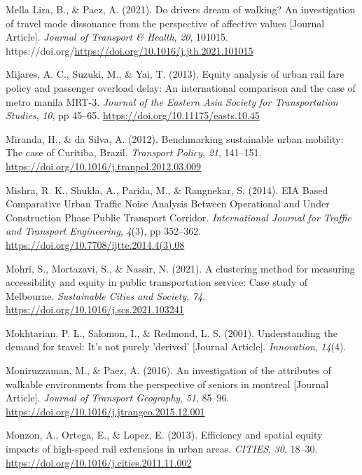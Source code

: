 \documentclass[
  letterpaper,
  DIV=11,
  numbers=noendperiod]{scrartcl}
\newlength{\cslhangindent}
\newenvironment{CSLReferences}[2] %
 {\begin{list}{}{%
  \setlength{\itemindent}{0pt}
  \setlength{\leftmargin}{0pt}
  \setlength{\parsep}{0pt}
  \ifodd #1
   \setlength{\leftmargin}{\cslhangindent}
   \setlength{\itemindent}{-1\cslhangindent}
  \fi
  \setlength{\itemsep}{#2\baselineskip}}}
 {\end{list}}
\begin{document}
\begin{CSLReferences}{1}{0}
Mella Lira, B., \& Paez, A. (2021). Do drivers dream of walking? An
investigation of travel mode dissonance from the perspective of
affective values {[}Journal Article{]}. \emph{Journal of Transport \&
Health}, \emph{20}, 101015.
https://doi.org/\url{https://doi.org/10.1016/j.jth.2021.101015}

Mijares, A. C., Suzuki, M., \& Yai, T. (2013). Equity analysis of urban
rail fare policy and passenger overload delay: An international
comparison and the case of metro manila {MRT}-3. \emph{Journal of the
Eastern Asia Society for Transportation Studies}, \emph{10}, pp 45--65.
\url{https://doi.org/10.11175/easts.10.45}

Miranda, H., \& da Silva, A. (2012). Benchmarking sustainable urban
mobility: {The} case of {Curitiba}, {Brazil}. \emph{Transport Policy},
\emph{21}, 141--151. \url{https://doi.org/10.1016/j.tranpol.2012.03.009}

Mishra, R. K., Shukla, A., Parida, M., \& Rangnekar, S. (2014). {EIA
Based Comparative Urban Traffic Noise Analysis Between Operational} and
{Under Construction Phase Public Transport Corridor}.
\emph{International Journal for Traffic and Transport Engineering},
\emph{4}(3), pp 352--362.
\url{https://doi.org/10.7708/ijtte.2014.4(3).08}

Mohri, S., Mortazavi, S., \& Nassir, N. (2021). A clustering method for
measuring accessibility and equity in public transportation service:
{Case} study of {Melbourne}. \emph{Sustainable Cities and Society},
\emph{74}. \url{https://doi.org/10.1016/j.scs.2021.103241}

Mokhtarian, P. L., Salomon, I., \& Redmond, L. S. (2001). Understanding
the demand for travel: It's not purely 'derived' {[}Journal Article{]}.
\emph{Innovation}, \emph{14}(4).

Moniruzzaman, M., \& Paez, A. (2016). An investigation of the attributes
of walkable environments from the perspective of seniors in montreal
{[}Journal Article{]}. \emph{Journal of Transport Geography}, \emph{51},
85--96. \url{https://doi.org/10.1016/j.jtrangeo.2015.12.001}

Monzon, A., Ortega, E., \& Lopez, E. (2013). Efficiency and spatial
equity impacts of high-speed rail extensions in urban areas.
\emph{CITIES}, \emph{30}, 18--30.
\url{https://doi.org/10.1016/j.cities.2011.11.002}


\end{CSLReferences}
\end{document}
